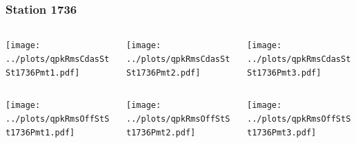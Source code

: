 \documentclass[aspectratio=169]{beamer}
\begin{document}
\begin{frame} 
  \frametitle{Station 1736}
  \begin{center}
    \begin{columns}
      \begin{column}{0.33\textwidth}
        \texttt{[image: ../plots/qpkRmsCdasStSt1736Pmt1.pdf]}
      \end{column}
      \begin{column}{0.33\textwidth}
        \texttt{[image: ../plots/qpkRmsCdasStSt1736Pmt2.pdf]}
      \end{column}
      \begin{column}{0.33\textwidth}
        \texttt{[image: ../plots/qpkRmsCdasStSt1736Pmt3.pdf]}
      \end{column}
    \end{columns}
  \end{center}

  \begin{center}
    \begin{columns}
      \begin{column}{0.33\textwidth}
        \texttt{[image: ../plots/qpkRmsOffStSt1736Pmt1.pdf]}
      \end{column}
      \begin{column}{0.33\textwidth}
        \texttt{[image: ../plots/qpkRmsOffStSt1736Pmt2.pdf]}
      \end{column}
      \begin{column}{0.33\textwidth}
        \texttt{[image: ../plots/qpkRmsOffStSt1736Pmt3.pdf]}
      \end{column}
    \end{columns}
  \end{center}
\end{frame}
\end{document}
